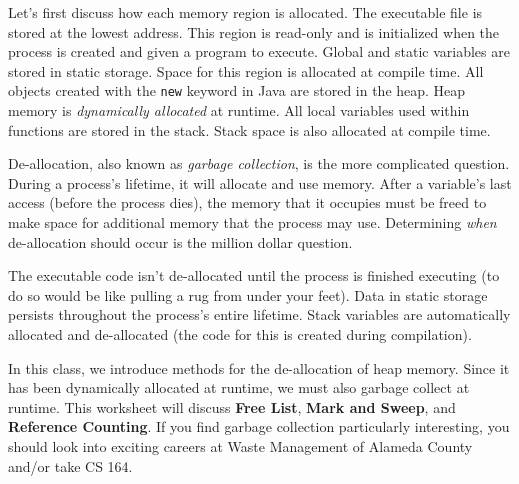 Let's first discuss how each memory region is allocated. The executable file is stored at the lowest address. This region is read-only and is initialized when the process is created and given a program to execute. Global and static variables are stored in static storage. Space for this region is allocated at compile time. All objects created with the \texttt{new} keyword in Java are stored in the heap. Heap memory is \textit{dynamically allocated} at runtime. All local variables used within functions are stored in the stack. Stack space is also allocated at compile time.

De-allocation, also known as \textit{garbage collection}, is the more complicated question. During a process's lifetime, it will allocate and use memory. After a variable's last access (before the process dies), the memory that it occupies must be freed to make space for additional memory that the process may use. Determining \textit{when} de-allocation should occur is the million dollar question.

The executable code isn't de-allocated until the process is finished executing (to do so would be like pulling a rug from under your feet). Data in static storage persists throughout the process's entire lifetime. Stack variables are automatically allocated and de-allocated (the code for this is created during compilation).

In this class, we introduce methods for the de-allocation of heap memory. Since it has been dynamically allocated at runtime, we must also garbage collect at runtime. This worksheet will discuss \textbf{Free List}, \textbf{Mark and Sweep}, and \textbf{Reference Counting}. If you find garbage collection particularly interesting, you should look into exciting careers at Waste Management of Alameda County and/or take CS 164.

\ifprintanswers\else
\begin{lstlisting}

\end{lstlisting}
\fi

\begin{solution}
\begin{lstlisting}

\end{lstlisting}
\end{solution}